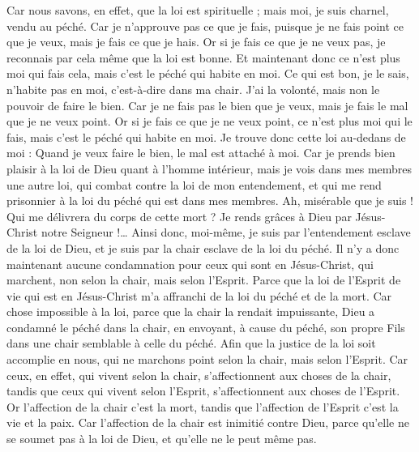 \begin{multicols}{2}
Car nous savons, en effet, que la loi est spirituelle ; mais moi, je suis charnel, vendu au péché.
\TextTitle{[la connaissance du bien incapable de délivrer l'homme du péché}
Car je n'approuve pas ce que je fais, puisque je ne fais point ce que je veux, mais je fais ce que je hais.
Or si je fais ce que je ne veux pas, je reconnais par cela même que la loi est bonne.
Et maintenant donc ce n'est plus moi qui fais cela, mais c'est le péché qui habite en moi.
Ce qui est bon, je le sais, n’habite pas en moi, c’est-à-dire dans ma chair. J’ai la volonté, mais non le pouvoir de faire le bien.
Car je ne fais pas le bien que je veux, mais je fais le mal que je ne veux point.
Or si je fais ce que je ne veux point, ce n'est plus moi qui le fais, mais c'est le péché qui habite en moi.
Je trouve donc cette loi au-dedans de moi : Quand je veux faire le bien, le mal est attaché à moi.
Car je prends bien plaisir à la loi de Dieu quant à l'homme intérieur,
mais je vois dans mes membres une autre loi, qui combat contre la loi de mon entendement, et qui me rend prisonnier à la loi du péché qui est dans mes membres.
Ah, misérable que je suis ! Qui me délivrera du corps de cette mort ?
Je rends grâces à Dieu par Jésus-Christ notre Seigneur !… Ainsi donc, moi-même, je suis par l’entendement esclave de la loi de Dieu, et je suis par la chair esclave de la loi du péché.
\VerseOne{}Il n'y a donc maintenant aucune condamnation pour ceux qui sont en Jésus-Christ, qui marchent, non selon la chair, mais selon l'Esprit.
Parce que la loi de l'Esprit de vie qui est en Jésus-Christ m'a affranchi de la loi du péché et de la mort.
Car chose impossible à la loi, parce que la chair la rendait impuissante, Dieu a condamné le péché dans la chair, en envoyant, à cause du péché, son propre Fils dans une chair semblable à celle du péché.
Afin que la justice de la loi soit accomplie en nous, qui ne marchons point selon la chair, mais selon l'Esprit.
Car ceux, en effet, qui vivent selon la chair, s’affectionnent aux choses de la chair, tandis que ceux qui vivent selon l'Esprit, s’affectionnent aux choses de l'Esprit.
Or l'affection de la chair c’est la mort, tandis que l'affection de l'Esprit c’est la vie et la paix.
Car l'affection de la chair est inimitié contre Dieu, parce qu’elle ne se soumet pas à la loi de Dieu, et qu’elle ne le peut même pas.

\end{multicols}
